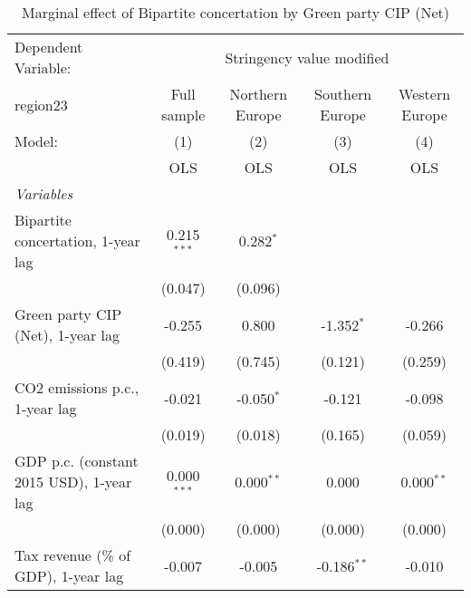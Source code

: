 
\begin{table}[htbp]
   \caption{Marginal effect of Bipartite concertation by Green party CIP (Net)}
   \centering
   \begin{tabular}{lcccc}
      \toprule
      Dependent Variable: & \multicolumn{4}{c}{Stringency value modified}\\
      region23                                                               & Full sample   & Northern Europe & Southern Europe & Western Europe \\   
      Model:                                                                 & (1)           & (2)             & (3)             & (4)\\  
                                                                             &  OLS          & OLS             & OLS             & OLS\\  
      \midrule
      \emph{Variables}\\
      Bipartite concertation, 1-year lag                                     & 0.215$^{***}$ & 0.282$^{*}$     &                 &   \\   
                                                                             & (0.047)       & (0.096)         &                 &   \\   
      Green party CIP (Net), 1-year lag                                      & -0.255        & 0.800           & -1.352$^{*}$    & -0.266\\   
                                                                             & (0.419)       & (0.745)         & (0.121)         & (0.259)\\   
      CO2 emissions p.c., 1-year lag                                         & -0.021        & -0.050$^{*}$    & -0.121          & -0.098\\   
                                                                             & (0.019)       & (0.018)         & (0.165)         & (0.059)\\   
      GDP p.c. (constant 2015 USD), 1-year lag                               & 0.000$^{***}$ & 0.000$^{**}$    & 0.000           & 0.000$^{**}$\\   
                                                                             & (0.000)       & (0.000)         & (0.000)         & (0.000)\\   
      Tax revenue (\% of GDP), 1-year lag                                    & -0.007        & -0.005          & -0.186$^{**}$   & -0.010\\   

\end{tabular}
\end{table}
